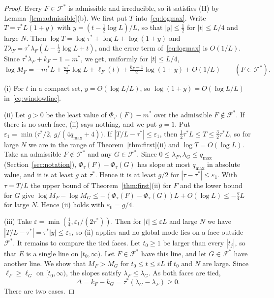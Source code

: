 \begin{proof}
Every $F\in\mathcal F^*$ is admissible and irreducible, so it satisfies (H) by
Lemma~\ref{lem:admissible}(b). We first put $T$ into~\eqref{eq:logmax}. Write
$T=\tau^*L(1+y)$ with $y=(t-\frac12\log L)/L$, so that $|y|\le\frac12$ for $|t|\le L/4$ and
large $N$. Then $\log T=\log\tau^*+\log L+\log(1+y)$ and
$T\lambda_F=\tau^*\lambda_F(L-\frac12\log L+t)$, and the error term of~\eqref{eq:logmax} is
$O(1/L)$. Since $\tau^*\lambda_F+k_F-1=m^*$, we get, uniformly for $|t|\le L/4$,
\begin{equation}\label{eq:windowline}
\log M_F=-m^*L+\tfrac{m^*}2\log L+\ell_F(t)+\tfrac{k_F-1}2\log(1+y)+O(1/L)
\qquad(F\in\mathcal F^*).
\end{equation}

(i) For $t$ in a compact set, $y=O(\log L/L)$, so $\log(1+y)=O(\log L/L)$
in~\eqref{eq:windowline}.

(ii) Let $g>0$ be the least value of $\Phi_{\tau^*}(F)-m^*$ over the admissible
$F\notin\mathcal F^*$. If there is no such face, (ii) says nothing, and we put $g=1$. Put
$\varepsilon_1=\min\bigl(\tau^*/2,\,g/(4q_{\max}+4)\bigr)$. If $|T/L-\tau^*|\le\varepsilon_1$, then
$\frac12\tau^*L\le T\le\frac32\tau^*L$, so for large $N$ we are in the range of
Theorem~\ref{thm:first}(ii) and $\log T=O(\log L)$. Take an admissible $F\notin\mathcal F^*$ and
any $G\in\mathcal F^*$. Since $0\le\lambda_F,\lambda_G\le q_{\max}$
(Section~\ref{sec:notation}), $\Phi_\tau(F)-\Phi_\tau(G)$ has slope at most $q_{\max}$ in
absolute value, and it is at least $g$ at $\tau^*$. Hence it is at least $g/2$ for
$|\tau-\tau^*|\le\varepsilon_1$. With $\tau=T/L$ the
upper bound of Theorem~\ref{thm:first}(ii) for $F$ and the lower bound for $G$ give
$\log M_F-\log M_G\le-(\Phi_\tau(F)-\Phi_\tau(G))L+O(\log L)\le-\frac g4L$ for large $N$. Hence (ii)
holds with $\varepsilon_0=g/4$.

(iii) Take $\varepsilon=\min(\frac14,\varepsilon_1/(2\tau^*))$. Then for $|t|\le\varepsilon L$
and large $N$ we have $|T/L-\tau^*|=\tau^*|y|\le\varepsilon_1$, so (ii) applies and no global
mode lies on a face outside $\mathcal F^*$. It remains to compare the tied faces. Let $t_0\ge1$
be larger than every $|t_j|$, so that $E$ is a single line on $[t_0,\infty)$. Let
$F\in\mathcal F^*$ have this line, and let $G\in\mathcal F^*$ have another line. We show that
$M_F>M_G$ for $t_0\le t\le\varepsilon L$ if $t_0$ and $N$ are large. Since $\ell_F\ge\ell_G$
on $[t_0,\infty)$, the slopes satisfy $\lambda_F\le\lambda_G$. As both faces are tied,
\[
\Delta=k_F-k_G=\tau^*(\lambda_G-\lambda_F)\ge0 .
\]
There are two cases.


\end{proof}
